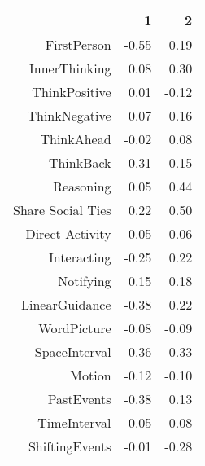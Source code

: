 \begin{table}[ht]
\centering
\begin{tabular}{rrr}
  \hline
 & 1 & 2 \\ 
  \hline
  FirstPerson & -0.55 & 0.19 \\ 
  InnerThinking & 0.08 & 0.30 \\ 
  ThinkPositive & 0.01 & -0.12 \\ 
  ThinkNegative & 0.07 & 0.16 \\ 
  ThinkAhead & -0.02 & 0.08 \\ 
  ThinkBack & -0.31 & 0.15 \\ 
  Reasoning & 0.05 & 0.44 \\ 
  Share Social Ties & 0.22 & 0.50 \\ 
  Direct Activity & 0.05 & 0.06 \\ 
  Interacting & -0.25 & 0.22 \\ 
  Notifying & 0.15 & 0.18 \\ 
  LinearGuidance & -0.38 & 0.22 \\ 
  WordPicture & -0.08 & -0.09 \\ 
  SpaceInterval & -0.36 & 0.33 \\ 
  Motion & -0.12 & -0.10 \\ 
  PastEvents & -0.38 & 0.13 \\ 
  TimeInterval & 0.05 & 0.08 \\ 
  ShiftingEvents & -0.01 & -0.28 \\ 
   \hline
\end{tabular}
\end{table}
